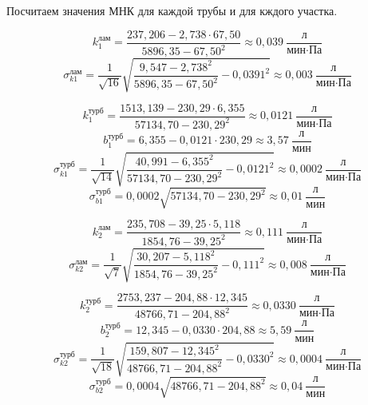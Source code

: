 \documentclass[a4paper,12pt]{article}
\begin{document}
Посчитаем значения МНК для каждой трубы и для кждого участка.

\begin{equation*}
    k_1^\text{лам} = \frac{237,206 - 2,738 \cdot 67,50}{5896,35 - {67,50}^2} \approx 0,039 \ \frac{\text{л}}{\text{мин} \cdot \text{Па}}
\end{equation*}
\begin{equation*}
    \sigma_{k1}^\text{лам} = \frac{1}{\sqrt{16}} \sqrt{\frac{9,547 - {2,738}^2}{5896,35 - {67,50}^2} - {0,0391}^2} \approx 0,003 \ \frac{\text{л}}{\text{мин} \cdot \text{Па}}
\end{equation*}


\begin{equation*}
    k_1^\text{турб} = \frac{1513,139 - 230,29 \cdot 6,355}{57134,70 - {230,29}^2} \approx 0,0121 \ \frac{\text{л}}{\text{мин} \cdot \text{Па}}
\end{equation*}
\begin{equation*}
    b_1^\text{турб} = 6,355 - 0,0121 \cdot 230,29 \approx 3,57 \ \frac{\text{л}}{\text{мин}}
\end{equation*}
\begin{equation*}
    \sigma_{k1}^\text{турб} = \frac{1}{\sqrt{14}} \sqrt{\frac{40,991 - {6,355}^2}{57134,70 - {230,29}^2} - {0,0121}^2} \approx 0,0002 \ \frac{\text{л}}{\text{мин} \cdot \text{Па}}
\end{equation*}
\begin{equation*}
    \sigma_{b1}^\text{турб} = 0,0002\sqrt{57134,70 - {230,29}^2} \approx 0,01 \ \frac{\text{л}}{\text{мин}}
\end{equation*}


\begin{equation*}
    k_2^\text{лам} = \frac{235,708 - 39,25 \cdot 5,118}{1854,76 - {39,25}^2} \approx 0,111 \ \frac{\text{л}}{\text{мин} \cdot \text{Па}}
\end{equation*}
\begin{equation*}
    \sigma_{k2}^\text{лам} = \frac{1}{\sqrt{7}} \sqrt{\frac{30,207 - {5,118}^2}{1854,76 - {39,25}^2} - {0,111}^2} \approx 0,008 \ \frac{\text{л}}{\text{мин} \cdot \text{Па}}
\end{equation*}


\begin{equation*}
    k_2^\text{турб} = \frac{2753,237 - 204,88 \cdot 12,345}{48766,71 - {204,88}^2} \approx 0,0330 \ \frac{\text{л}}{\text{мин} \cdot \text{Па}}
\end{equation*}
\begin{equation*}
    b_2^\text{турб} = 12,345 - 0,0330 \cdot 204,88 \approx 5,59 \ \frac{\text{л}}{\text{мин}}
\end{equation*}
\begin{equation*}
    \sigma_{k2}^\text{турб} = \frac{1}{\sqrt{18}} \sqrt{\frac{159,807 - {12,345}^2}{48766,71 - {204,88}^2} - {0,0330}^2} \approx 0,0004 \ \frac{\text{л}}{\text{мин} \cdot \text{Па}}
\end{equation*}
\begin{equation*}
    \sigma_{b2}^\text{турб} = 0,0004 \sqrt{48766,71 - {204,88}^2} \approx 0,04 \ \frac{\text{л}}{\text{мин}}
\end{equation*}
\end{document}
